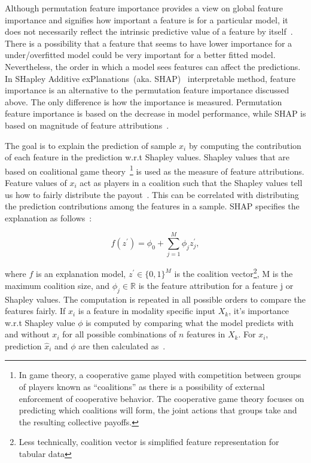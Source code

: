 \hspace*{3.5mm} Although permutation feature importance provides a view on global feature importance and signifies how important a feature is for a particular model, it does not necessarily reflect the intrinsic predictive value of a feature by itself~\cite{molnar2019interpretable}. There is a possibility that a feature that seems to have lower importance for a under/overfitted model could be very important for a better fitted model. Nevertheless, the order in which a model sees features can affect the predictions. In SHapley Additive exPlanations~(aka. SHAP)~\cite{SHAP} interpretable method, feature importance is an alternative to the permutation feature importance discussed above. The only difference is how the importance is measured. Permutation feature importance is based on the decrease in model performance, while SHAP is based on magnitude of feature attributions~\cite{molnar2019interpretable}. 

\hspace*{3.5mm} The goal is to explain the prediction of sample $x_i$ by computing the contribution of each feature in the prediction w.r.t Shapley values. Shapley values that are based on coalitional game theory~\cite{branzei2008models}\footnote{In game theory, a cooperative game played with competition between groups of players known as ``coalitions'' as there is a possibility of external enforcement of cooperative behavior. The cooperative game theory focuses on predicting which coalitions will form, the joint actions that groups take and the resulting collective payoffs.} is used as the measure of feature attributions. Feature values of $x_i$ act as players in a coalition such that the Shapley values tell us how to fairly distribute the  payout~\cite{molnar2019interpretable}. This can be correlated with distributing the prediction contributions among the features in a sample. SHAP specifies the explanation as follows~\cite{molnar2019interpretable}:

\begin{equation}
    f\left(z^{\prime}\right)=\phi_{0}+\sum_{j=1}^{M} \phi_{j} z_{j}^{\prime},
\end{equation}

\hspace*{3.5mm} where $f$ is an explanation model, $z^{\prime} \in\{0,1\}^{M}$ is the coalition vector\footnote{Less technically, coalition vector is simplified feature representation for tabular data}, $\mathrm{M}$ is the maximum coalition size, and $\phi_{j} \in \mathbb{R}$ is the feature attribution for a feature $\mathrm{j}$ or Shapley values. The computation is repeated in all possible orders to compare the features fairly. If $x_i$ is a feature in modality specific input $X_k$, it's importance w.r.t Shapley value $\phi$ is computed by comparing what the model predicts with and without $x_i$ for all possible combinations of $n$ features in $X_k$. For $x_i$, prediction $\hat x_i$ and $\phi$ are then calculated as~\cite{NIPS2017_7062}. 

